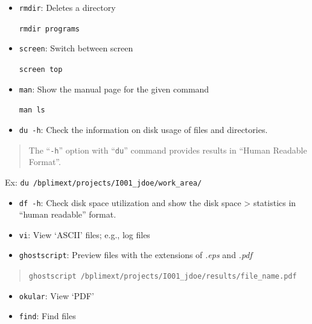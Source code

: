 \documentclass[
  11pt,
  a4paper,
]{article}
\providecommand{\tightlist}{%
  \setlength{\itemsep}{0pt}\setlength{\parskip}{0pt}}
\begin{document}
\begin{itemize}
\item
  \texttt{rmdir}: Deletes a directory

  \texttt{rmdir\ programs}
\end{itemize}

\begin{itemize}
\item
  \texttt{screen}: Switch between screen

  \texttt{screen\ top}
\end{itemize}

\begin{itemize}
\item
  \texttt{man}: Show the manual page for the given command

  \texttt{man\ ls}
\end{itemize}

\begin{itemize}
\tightlist
\item
  \texttt{du\ -h}: Check the information on disk usage of files and
  directories.
\end{itemize}

\begin{quote}
The ``\texttt{-h}'' option with ``\texttt{du}'' command provides results
in ``Human Readable Format''.
\end{quote}

Ex: \texttt{du\ /bplimext/projects/I001\_jdoe/work\_area/}

\begin{itemize}
\item
  \texttt{df\ -h}: Check disk space utilization and show the disk space
  \textgreater{} statistics in ``human readable'' format.
\item
  \texttt{vi}: View `ASCII' files; e.g., log files
\item
  \texttt{ghostscript}: Preview files with the extensions of \emph{.eps}
  and \emph{.pdf}
\end{itemize}

\begin{quote}
\texttt{ghostscript\ /bplimext/projects/I001\_jdoe/results/file\_name.pdf}
\end{quote}

\begin{itemize}
\item
  \texttt{okular}: View `PDF'
\item
  \texttt{find}: Find files
\end{itemize}
\end{document}
